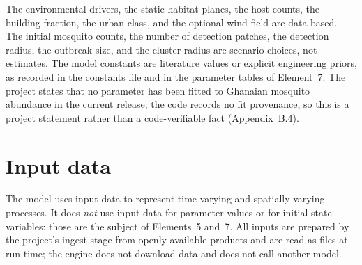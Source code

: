 \documentclass[11pt,a4paper]{article}
\begin{document}
The environmental drivers, the static habitat planes, the host counts,
the building fraction, the urban class, and the optional wind field are data-based. The initial mosquito counts, the number of
detection patches, the detection radius, the outbreak size, and the
cluster radius are scenario choices, not estimates. The model constants
are literature values or explicit engineering priors, as recorded in the
constants file and in the parameter tables of Element~7. The project states
that no parameter has been fitted to Ghanaian mosquito abundance in the
current release; the code records no fit provenance, so this is a project
statement rather than a code-verifiable fact
(Appendix~B.4).

\section{Input data}

The model uses input data to represent time-varying and spatially varying
processes. It does \emph{not} use input data for parameter values or for
initial state variables: those are the subject of Elements~5 and~7. All
inputs are prepared by the project's ingest stage from openly available
products and are read as files at run time; the engine does not download
data and does not call another model.
\end{document}
